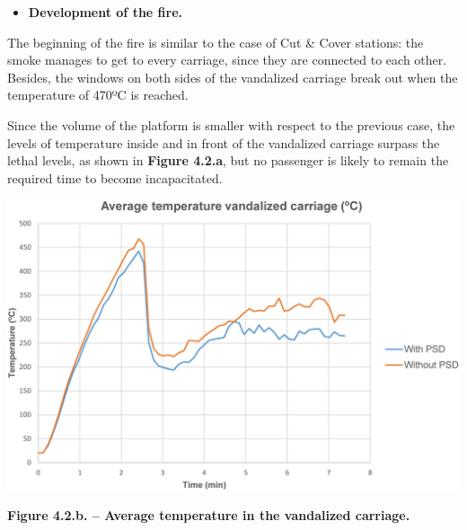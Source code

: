 \documentclass{article}
\begin{document}
\begin{itemize}[noitemsep,topsep=\mdcompacttopsep]%

\item{}\textbf{Development of the fire.}%
\end{itemize}%

\noindent{}The beginning of the fire is similar to the case of Cut \& Cover stations: the smoke 
manages to get to every carriage, since they are connected to each other. Besides, 
the windows on both sides of the vandalized carriage break out when the temperature 
of 470ºC is reached.%

Since the volume of the platform is smaller with respect to the previous case, 
the levels of temperature inside and in front of the vandalized carriage surpass 
the lethal levels, as shown in \textbf{Figure 4.2.a}, but no passenger is likely to remain 
the required time to become incapacitated.%

\begin{mdcenter}%

\noindent{}\includegraphics[keepaspectratio=true,width=\dimmin{}{\dimwidth{0.55}}]{images/Fig-4.2.b}{}%
\end{mdcenter}%

\begin{mdcenter}%

\noindent{}\textbf{Figure 4.2.b. – Average temperature in the vandalized carriage.}%
\end{mdcenter}%
\end{document}

